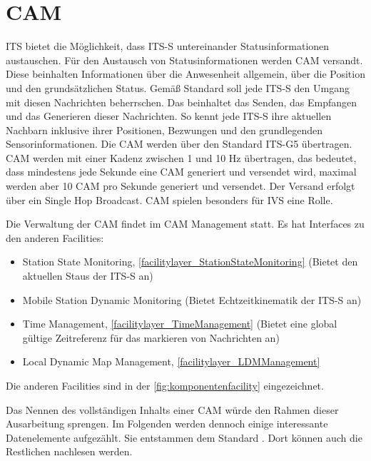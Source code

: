 \section{CAM\label{sec:cam}}
\ac{ITS} bietet die Möglichkeit, dass \ac{ITS-S} untereinander Statusinformationen austauschen. Für den Austausch von Statusinformationen werden \ac{CAM} versandt. Diese beinhalten Informationen über die Anwesenheit allgemein, über die Position und den grundsätzlichen Status. Gemäß Standard \cite{ts102637-2} soll jede \ac{ITS-S} den Umgang mit diesen Nachrichten beherrschen. Das beinhaltet das Senden, das Empfangen und das Generieren dieser Nachrichten. So kennt jede \ac{ITS-S} ihre aktuellen Nachbarn inklusive ihrer Positionen, Bezwungen und den grundlegenden Sensorinformationen. Die \ac{CAM} werden über den Standard \ac{ITS-G5} übertragen. \ac{CAM} werden mit einer Kadenz zwischen 1 und 10 Hz übertragen, das bedeutet, dass mindestens jede Sekunde eine \ac{CAM} generiert und versendet wird, maximal werden aber 10 \ac{CAM} pro Sekunde generiert und versendet. Der Versand erfolgt über ein Single Hop Broadcast. \ac{CAM} spielen besonders für \ac{IVS} eine Rolle.

Die Verwaltung der \ac{CAM} findet im \ac{CAM} Management statt. Es hat Interfaces zu den anderen Facilities:
\begin{itemize}
	\item Station State Monitoring, \autoref{facilitylayer_StationStateMonitoring} (Bietet den aktuellen Staus der \ac{ITS-S} an)
	\item Mobile Station Dynamic Monitoring (Bietet Echtzeitkinematik der \ac{ITS-S} an)
	\item Time Management, \autoref{facilitylayer_TimeManagement} (Bietet eine global gültige Zeitreferenz für das markieren von Nachrichten an)
	\item Local Dynamic Map Management, \autoref{facilitylayer_LDMManagement}
\end{itemize}

Die anderen Facilities sind in der \autoref{fig:komponentenfacility} eingezeichnet. 

Das Nennen des vollständigen Inhalts einer \ac{CAM} würde den Rahmen dieser Ausarbeitung sprengen. Im Folgenden werden dennoch einige interessante Datenelemente aufgezählt. Sie entstammen dem Standard \cite{ts102637-2}. Dort können auch die Restlichen nachlesen werden.

